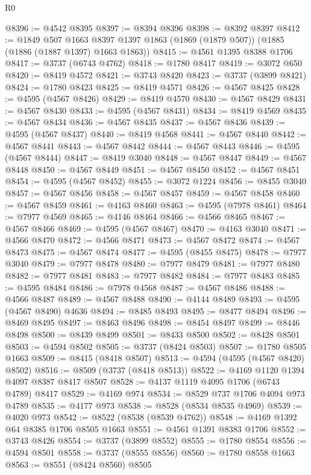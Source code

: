 \begin{lexlean}{R0}
\begin{coremodule}
@8396 := @4542 @8395
@8397 := @8394 @8396
@8398 := @8392 @8397
@8412 := @1849
    @507
    @1663
    @8397
    @1397
    @1863
    (@1869 (@1879 @507))
    (@1885 (@1886 (@1887 @1397) @1663 @1863))
@8415 := @4561 @1395 @8388 @1706
@8417 := @3737 (@6743 @4762)
@8418 := @1780 @8417
@8419 := @3072 @650
@8420 := @8419 @4572
@8421 := @3743 @8420
@8423 := @3737 (@3899 @8421)
@8424 := @1780 @8423
@8425 := @8419 @4571
@8426 := @4567 @8425
@8428 := @4595 (@4567 @8426)
@8429 := @8419 @4570
@8430 := @4567 @8429
@8431 := @4567 @8430
@8433 := @4595 (@4567 @8431)
@8434 := @8419 @4569
@8435 := @4567 @8434
@8436 := @4567 @8435
@8437 := @4567 @8436
@8439 := @4595 (@4567 @8437)
@8440 := @8419 @4568
@8441 := @4567 @8440
@8442 := @4567 @8441
@8443 := @4567 @8442
@8444 := @4567 @8443
@8446 := @4595 (@4567 @8444)
@8447 := @8419 @3040
@8448 := @4567 @8447
@8449 := @4567 @8448
@8450 := @4567 @8449
@8451 := @4567 @8450
@8452 := @4567 @8451
@8454 := @4595 (@4567 @8452)
@8455 := @3072 @1224
@8456 := @8455 @3040
@8457 := @4567 @8456
@8458 := @4567 @8457
@8459 := @4567 @8458
@8460 := @4567 @8459
@8461 := @4163 @8460
@8463 := @4595 (@7978 @8461)
@8464 := @7977 @4569
@8465 := @4146 @8464
@8466 := @4566 @8465
@8467 := @4567 @8466
@8469 := @4595 (@4567 @8467)
@8470 := @4163 @3040
@8471 := @4566 @8470
@8472 := @4566 @8471
@8473 := @4567 @8472
@8474 := @4567 @8473
@8475 := @4567 @8474
@8477 := @4595 (@8455 @8475)
@8478 := @7977 @3040
@8479 := @7977 @8478
@8480 := @7977 @8479
@8481 := @7977 @8480
@8482 := @7977 @8481
@8483 := @7977 @8482
@8484 := @7977 @8483
@8485 := @4595 @8484
@8486 := @7978 @4568
@8487 := @4567 @8486
@8488 := @4566 @8487
@8489 := @4567 @8488
@8490 := @4144 @8489
@8493 := @4595 (@4567 @8490) @4636
@8494 := @8485 @8493
@8495 := @8477 @8494
@8496 := @8469 @8495
@8497 := @8463 @8496
@8498 := @8454 @8497
@8499 := @8446 @8498
@8500 := @8439 @8499
@8501 := @8433 @8500
@8502 := @8428 @8501
@8503 := @4594 @8502
@8505 := @3737 (@8424 @8503)
@8507 := @1780 @8505 @1663
@8509 := @8415 (@8418 @8507)
@8513 := @4594 (@4595 (@4567 @8420) @8502)
@8516 := @8509 (@3737 (@8418 @8513))
@8522 := @4169 @1120 @1394 @4097 @8387 @8417 @8507
@8528 := @4137 @1119 @4095 @1706 (@6743 @4789) @8417
@8529 := @4169 @974
@8534 := @8529 @737 @1706 @4094 @973 @4789
@8535 := @4177 @973
@8538 := @8528 (@8534 @8535 @4969)
@8539 := @4020 @973
@8542 := @8522 (@8538 (@8539 @4762))
@8548 := @4169 @1392 @64 @8385 @1706 @8505 @1663
@8551 := @4561 @1391 @8383 @1706
@8552 := @3743 @8426
@8554 := @3737 (@3899 @8552)
@8555 := @1780 @8554
@8556 := @4594 @8501
@8558 := @3737 (@8555 @8556)
@8560 := @1780 @8558 @1663
@8563 := @8551 (@8424 @8560) @8505

\end{coremodule}
\end{lexlean}
